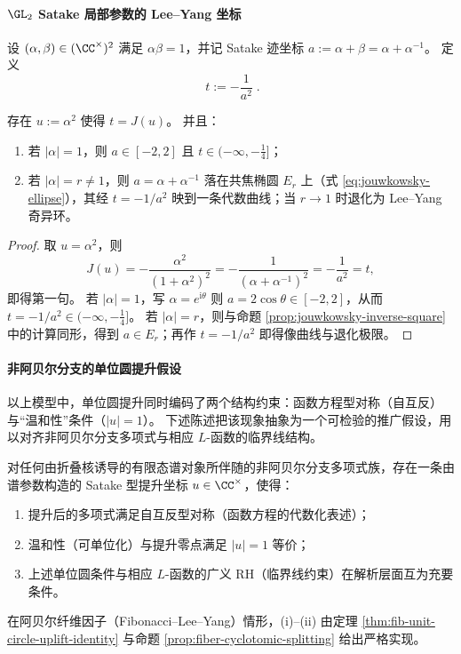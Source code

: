 \paragraph{\texorpdfstring{$\GL_2$}{GL2} Satake 局部参数的 Lee--Yang 坐标}
设 \((\alpha,\beta)\in(\CC^{\times})^2\) 满足 \(\alpha\beta=1\)，并记 Satake 迹坐标 \(a:=\alpha+\beta=\alpha+\alpha^{-1}\)。
定义
\begin{equation}\label{eq:satake-lee-yang-coordinate}
\boxed{\;t:=-\frac{1}{a^2}\; }.
\end{equation}

\begin{proposition}\label{prop:satake-circle-to-singular-ring}
存在 \(u:=\alpha^2\) 使得 \(t=J(u)\)。
并且：
\begin{enumerate}
  \item 若 \(|\alpha|=1\)，则 \(a\in[-2,2]\) 且 \(t\in(-\infty,-\tfrac14]\)；
  \item 若 \(|\alpha|=r\neq 1\)，则 \(a=\alpha+\alpha^{-1}\) 落在共焦椭圆 \(E_r\) 上（式 \eqref{eq:jouwkowsky-ellipse}），其经 \(t=-1/a^2\) 映到一条代数曲线；当 \(r\to 1\) 时退化为 Lee--Yang 奇异环。
\end{enumerate}
\end{proposition}
\begin{proof}
取 \(u=\alpha^2\)，则
\[
J(u)=-\frac{\alpha^2}{(1+\alpha^2)^2}=-\frac{1}{(\alpha+\alpha^{-1})^2}=-\frac{1}{a^2}=t,
\]
即得第一句。
若 \(|\alpha|=1\)，写 \(\alpha=e^{\mathrm{i}\theta}\) 则 \(a=2\cos\theta\in[-2,2]\)，从而 \(t=-1/a^2\in(-\infty,-\tfrac14]\)。
若 \(|\alpha|=r\)，则与命题 \ref{prop:jouwkowsky-inverse-square} 中的计算同形，得到 \(a\in E_r\)；再作 \(t=-1/a^2\) 即得像曲线与退化极限。
\end{proof}

\paragraph{非阿贝尔分支的单位圆提升假设}
以上模型中，单位圆提升同时编码了两个结构约束：函数方程型对称（自互反）与“温和性”条件（\(|u|=1\)）。
下述陈述把该现象抽象为一个可检验的推广假设，用以对齐非阿贝尔分支多项式与相应 \(L\)-函数的临界线结构。

\begin{conjecture}[奇异环温和化原理]\label{conj:singular-ring-temperedness}
对任何由折叠核诱导的有限态谱对象所伴随的非阿贝尔分支多项式族，存在一条由谱参数构造的 Satake 型提升坐标 \(u\in\CC^{\times}\)，使得：
\begin{enumerate}
  \item 提升后的多项式满足自互反型对称（函数方程的代数化表述）；
  \item 温和性（可单位化）与提升零点满足 \(|u|=1\) 等价；
  \item 上述单位圆条件与相应 \(L\)-函数的广义 RH（临界线约束）在解析层面互为充要条件。
\end{enumerate}
在阿贝尔纤维因子（Fibonacci--Lee--Yang）情形，(i)--(ii) 由定理 \ref{thm:fib-unit-circle-uplift-identity} 与命题 \ref{prop:fiber-cyclotomic-splitting} 给出严格实现。
\end{conjecture}



